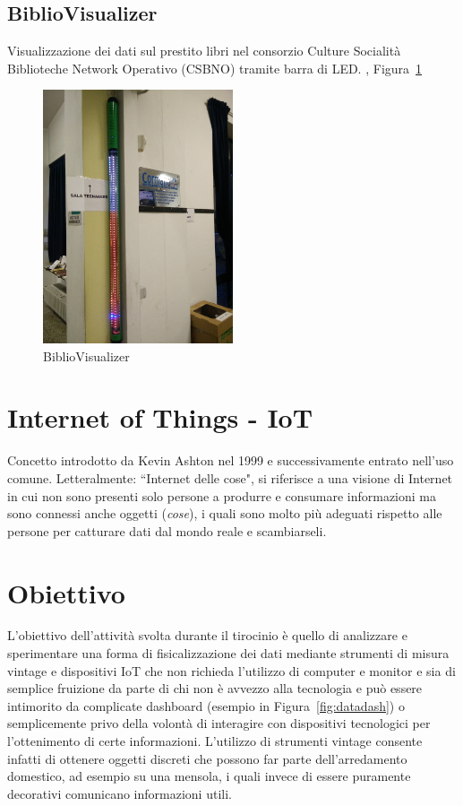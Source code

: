 \documentclass[12pt,a4paper]{report}
\begin{document}
\subsection{BiblioVisualizer}
Visualizzazione dei dati sul prestito libri nel consorzio Culture Socialità Biblioteche Network Operativo (CSBNO) tramite barra di LED.
\cite{bibliovisgitlab}, Figura~\ref{fig:bibliovisualizer}
\begin{figure}[h]
  \centering
  \includegraphics[width=0.5\textwidth]{bibliovisualizer}
  \caption{BiblioVisualizer}
  \label{fig:bibliovisualizer}
\end{figure}

\section{Internet of Things - IoT}
Concetto introdotto da Kevin Ashton nel 1999 e successivamente entrato nell'uso comune. Letteralmente: ``Internet delle cose",
si riferisce a una visione di Internet in cui non sono presenti solo persone a produrre e consumare informazioni ma
sono connessi anche oggetti (\emph{cose}), i quali sono molto più adeguati rispetto alle persone per catturare dati dal mondo reale
e scambiarseli.
\cite{ashton2009internet}

\section{Obiettivo}
L'obiettivo dell'attività svolta durante il tirocinio è quello di analizzare e sperimentare una forma di fisicalizzazione
dei dati mediante strumenti di misura vintage e dispositivi IoT che non richieda l'utilizzo di computer e monitor e sia di semplice fruizione
da parte di chi non è avvezzo alla tecnologia e può essere intimorito da complicate dashboard (esempio in Figura~\ref{fig:datadash})
o semplicemente privo della volontà di interagire con dispositivi tecnologici per l'ottenimento di certe informazioni.
L'utilizzo di strumenti vintage consente infatti di ottenere oggetti discreti che possono far parte dell'arredamento domestico,
ad esempio su una mensola, i quali invece di essere puramente decorativi comunicano informazioni utili.
\end{document}

